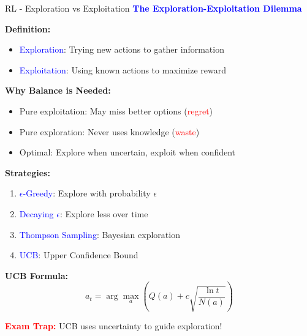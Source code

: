 \documentclass[8pt]{beamer}
\begin{document}
\begin{frame}{RL - Exploration vs Exploitation}
\fontsize{6.5}{7.5}\selectfont
\textcolor{blue}{\textbf{The Exploration-Exploitation Dilemma}}

\textbf{Definition:}
\begin{itemize}
\item \textcolor{blue}{Exploration}: Trying new actions to gather information
\item \textcolor{blue}{Exploitation}: Using known actions to maximize reward
\end{itemize}

\textbf{Why Balance is Needed:}
\begin{itemize}
\item Pure exploitation: May miss better options (\textcolor{red}{regret})
\item Pure exploration: Never uses knowledge (\textcolor{red}{waste})
\item Optimal: Explore when uncertain, exploit when confident
\end{itemize}

\textbf{Strategies:}
\begin{enumerate}
\item \textcolor{blue}{$\epsilon$-Greedy}: Explore with probability $\epsilon$
\item \textcolor{blue}{Decaying $\epsilon$}: Explore less over time
\item \textcolor{blue}{Thompson Sampling}: Bayesian exploration
\item \textcolor{blue}{UCB}: Upper Confidence Bound
\end{enumerate}

\textbf{UCB Formula:}
\[
a_t = \arg\max_a \left( Q(a) + c \sqrt{\frac{\ln t}{N(a)}} \right)
\]

\textcolor{red}{\textbf{Exam Trap:}} UCB uses uncertainty to guide exploration!
\end{frame}
\end{document}
